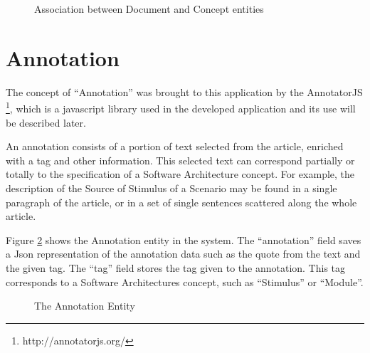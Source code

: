 \begin{figure}[h]
\centering
\renewcommand {\umltextcolor}{black}
\renewcommand {\umlfillcolor}{none}
\renewcommand {\umldrawcolor}{black}

\caption{Association between Document and Concept entities}
\label{figure:documentConcept}
\end{figure}

\section{Annotation}
\label{section:annotation}

The concept of ``Annotation'' was brought to this application by the AnnotatorJS \footnote{http://annotatorjs.org/}, which is a javascript library used in the developed application and its use will be described later.

An annotation consists of a portion of text selected from the article, enriched with a tag and other information. This selected text can correspond partially or totally to the specification of a Software Architecture concept. For example, the description of the Source of Stimulus of a Scenario may be found in a single paragraph of the article, or in a set of single sentences scattered along the whole article. 

Figure \ref{figure:annotationEntity} shows the Annotation entity in the system. The ``annotation'' field saves a Json representation of the annotation data such as the quote from the text and the given tag. The ``tag'' field stores the tag given to the annotation. This tag corresponds to a Software Architectures concept, such as ``Stimulus'' or ``Module''.

\begin{figure}[h]
\centering
\renewcommand {\umltextcolor}{black}
\renewcommand {\umlfillcolor}{none}
\renewcommand {\umldrawcolor}{black}

\caption{The Annotation Entity}
\label{figure:annotationEntity}
\end{figure}

